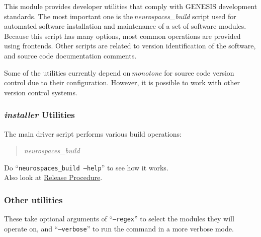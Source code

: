 \documentclass[12pt]{article}
\begin{document}
This module provides developer utilities that comply with GENESIS development standards. The most important one is the\,{\it neurospaces\_build} script used for automated software installation and maintenance of a set of software modules. Because this script has many options, most common operations are provided using frontends. Other scripts are related to version identification of the software, and source code documentation comments.

Some of the utilities currently depend on\,{\it monotone} for source code version control due to their configuration. However, it is possible to work with other version control systems. 

\subsubsection*{{\it installer} Utilities}

The main driver script performs various build operations:
\begin{quote}
\item {\it neurospaces\_build}
\end{quote}
Do ``{\tt neurospaces\_build --help}'' to see how it works.\\Also look at \href{../release-procedure/release-procedure.pdf}{Release Procedure}. 

\subsubsection*{Other utilities}

These take optional arguments of ``{\tt --regex}'' to select the modules they will operate on, and ``{\tt --verbose}'' to run the command in a more verbose mode. 
\end{document}
